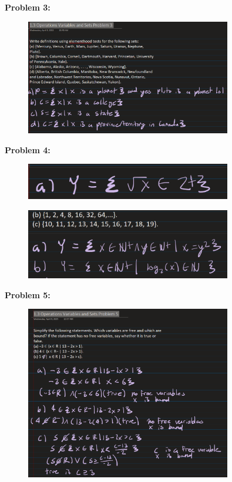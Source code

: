 \textbf{Problem 3:}
\begin{figure}[H]
    \centering
    \includegraphics[width=0.8\textwidth]{images/1.2/17.PNG}
\end{figure}

\textbf{Problem 4:}
\begin{figure}[H]
    \centering
    \includegraphics[width=0.8\textwidth]{images/1.2/18.PNG}
\end{figure}
\begin{figure}[H]
    \centering
    \includegraphics[width=0.8\textwidth]{images/1.2/19.PNG}
\end{figure}

\textbf{Problem 5:}
\begin{figure}[H]
    \centering
    \includegraphics[width=0.8\textwidth]{images/1.2/20.PNG}
\end{figure}

